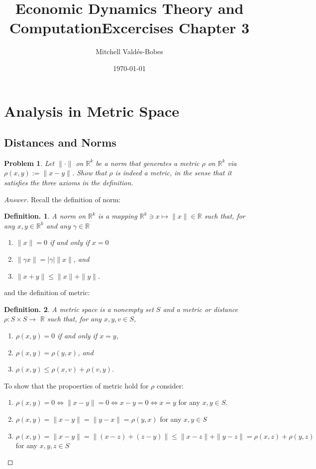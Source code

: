 \documentclass{article}
\title{Economic Dynamics Theory and Computation\newline Excercises Chapter 3}
\author{Mitchell Valdés-Bobes}
\date{\today}
\newtheorem{defin}{Definition.}
\newtheorem{problem}{Problem}[section]
\begin{document}
\maketitle
\section{Analysis in Metric Space}

\subsection{Distances and Norms}
\begin{problem}
    Let $\|\cdot\|$ on $\mathbb{R}^{k}$ be a norm that generates a metric $\rho$ on $\mathbb{R}^{k}$ via $\rho(x, y):=\|x-y\|$. 
    Show that $\rho$ is indeed a metric, in the sense that it satisfies the three axioms in the definition.
\end{problem}

\begin{proof}[Answer]
    Recall the definition of norm:
    \begin{defin}
        A norm on $\mathbb{R}^{k}$ is a mapping $\mathbb{R}^{k} \ni x \mapsto\|x\| \in \mathbb{R}$ such that, for any $x, y \in \mathbb{R}^{k}$ and any $\gamma \in \mathbb{R}$
        \begin{enumerate}
            \item $\|x\|=0$ if and only if $x=0$
            \item $\|\gamma x\|=|\gamma|\|x\|$, and
            \item $\|x+y\| \leq\|x\|+\|y\|$.
        \end{enumerate}
    \end{defin}
    and the definition of metric:
    \begin{defin}
    A metric space is a nonempty set $S$ and a metric or distance $\rho: S \times S \rightarrow$ $\mathbb{R}$ such that, for any $x, y, v \in S$,
        \begin{enumerate}
            \item $\rho(x, y)=0$ if and only if $x=y$,
            \item $\rho(x, y)=\rho(y, x)$, and
            \item $\rho(x, y) \leq \rho(x, v)+\rho(v, y)$.
        \end{enumerate}
    \end{defin}

    To show that the propoerties of metric hold for $\rho$ consider:
    \begin{enumerate}
        \item $\rho(x,y)=0\iff\|x-y\|=0\iff x-y=0\iff x=y$  for any $x,y \in S$.
        \item $\rho(x,y)=\|x-y\|=\|y-x\|=\rho(y,x)$ for any $x,y \in S$
        \item $\rho(x,y)=\|x-y\|=\|(x-z)+(z-y)\|\leq\|x-z\|+ \|y-z\| = \rho(x,z) + \rho(y,z)$ for any $x,y,z\in S$
    \end{enumerate}

\end{proof}
\end{document}
